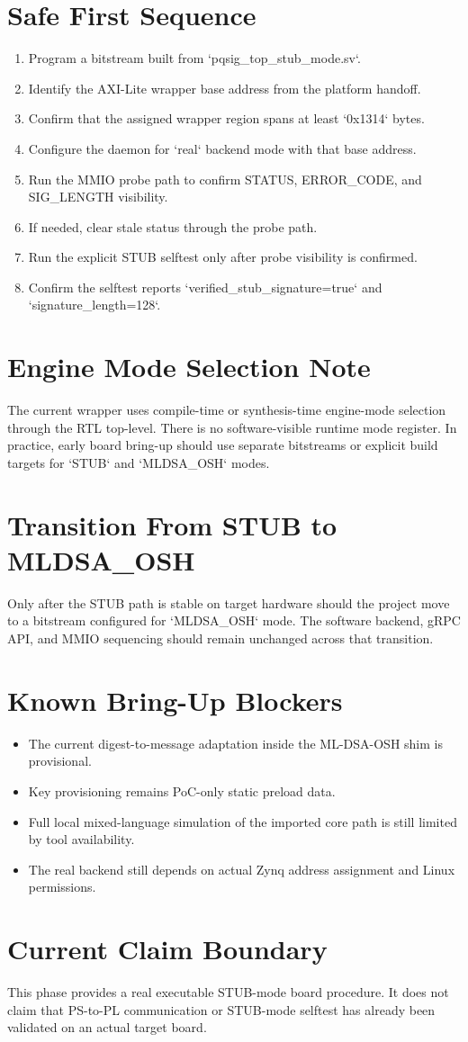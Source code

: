 \section{Safe First Sequence}
\begin{enumerate}[leftmargin=*]
  \item Program a bitstream built from `pqsig\_top\_stub\_mode.sv`.
  \item Identify the AXI-Lite wrapper base address from the platform handoff.
  \item Confirm that the assigned wrapper region spans at least `0x1314` bytes.
  \item Configure the daemon for `real` backend mode with that base address.
  \item Run the MMIO probe path to confirm STATUS, ERROR\_CODE, and SIG\_LENGTH visibility.
  \item If needed, clear stale status through the probe path.
  \item Run the explicit STUB selftest only after probe visibility is confirmed.
  \item Confirm the selftest reports `verified\_stub\_signature=true` and `signature\_length=128`.
\end{enumerate}

\section{Engine Mode Selection Note}
The current wrapper uses compile-time or synthesis-time engine-mode selection through the RTL top-level. There is no software-visible runtime mode register. In practice, early board bring-up should use separate bitstreams or explicit build targets for `STUB` and `MLDSA\_OSH` modes.

\section{Transition From STUB to MLDSA\_OSH}
Only after the STUB path is stable on target hardware should the project move to a bitstream configured for `MLDSA\_OSH` mode. The software backend, gRPC API, and MMIO sequencing should remain unchanged across that transition.

\section{Known Bring-Up Blockers}
\begin{itemize}[leftmargin=*]
  \item The current digest-to-message adaptation inside the ML-DSA-OSH shim is provisional.
  \item Key provisioning remains PoC-only static preload data.
  \item Full local mixed-language simulation of the imported core path is still limited by tool availability.
  \item The real backend still depends on actual Zynq address assignment and Linux permissions.
\end{itemize}

\section{Current Claim Boundary}
This phase provides a real executable STUB-mode board procedure. It does not claim that PS-to-PL communication or STUB-mode selftest has already been validated on an actual target board.
